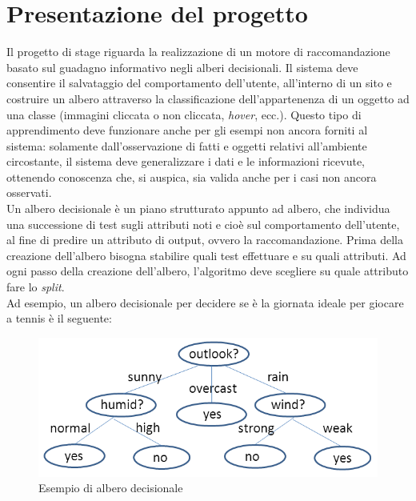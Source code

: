 \section{Presentazione del progetto}
Il progetto di stage riguarda la realizzazione di un motore di raccomandazione basato sul guadagno informativo negli alberi decisionali. Il sistema deve consentire il salvataggio del comportamento dell'utente, all'interno di un sito e costruire un albero attraverso la classificazione dell'appartenenza di un oggetto ad una classe (immagini cliccata o non cliccata, \textit{hover}, ecc.). Questo tipo di apprendimento deve funzionare anche per gli esempi non ancora forniti al sistema: solamente dall'osservazione di fatti e oggetti relativi all'ambiente circostante, il sistema deve generalizzare i dati e le informazioni ricevute, ottenendo conoscenza che, si auspica, sia valida anche per i casi non ancora osservati.\\
Un albero decisionale è un piano strutturato appunto ad albero, che individua una successione di test sugli attributi noti e cioè sul comportamento dell'utente, al fine di predire un attributo  di output, ovvero la raccomandazione. Prima della creazione dell'albero bisogna stabilire quali test effettuare e su quali attributi. Ad ogni passo della creazione dell'albero, l'algoritmo deve scegliere su quale attributo fare lo \textit{split}.\\
Ad esempio, un albero decisionale per decidere  se è la giornata ideale per giocare a tennis è il seguente:
\begin{figure}[h]
\centering
\includegraphics[width=0.7\linewidth]{immagini/play}
\caption[Esempio di albero decisionale]{Esempio di albero decisionale}
\label{fig:albero-decisionale-esempio}
\end{figure}

